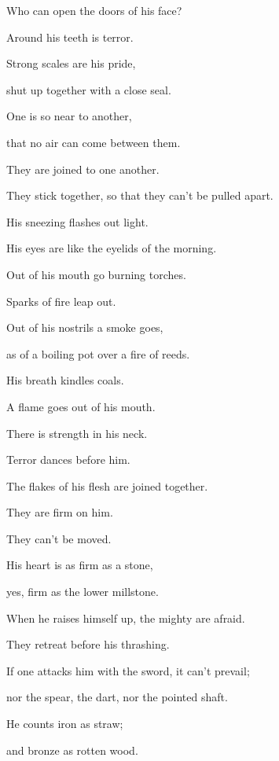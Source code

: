 {\par }{\Q {}Who can open the doors of his face?
\par }{\QB Around his teeth is terror.
\par }{\Q {}Strong scales are his pride,
\par }{\QB shut up together with a close seal.
\par }{\BB \par }{\Q {}One is so near to another,
\par }{\QB that no air can come between them.
\par }{\Q {}They are joined to one another.
\par }{\QB They stick together, so that they can’t be pulled apart.
\par }{\Q {}His sneezing flashes out light.
\par }{\QB His eyes are like the eyelids of the morning.
\par }{\Q {}Out of his mouth go burning torches.
\par }{\QB Sparks of fire leap out.
\par }{\Q {}Out of his nostrils a smoke goes,
\par }{\QB as of a boiling pot over a fire of reeds.
\par }{\Q {}His breath kindles coals.
\par }{\QB A flame goes out of his mouth.
\par }{\Q {}There is strength in his neck.
\par }{\QB Terror dances before him.
\par }{\Q {}The flakes of his flesh are joined together.
\par }{\QB They are firm on him.
\par }{\QB They can’t be moved.
\par }{\Q {}His heart is as firm as a stone,
\par }{\QB yes, firm as the lower millstone.
\par }{\Q {}When he raises himself up, the mighty are afraid.
\par }{\QB They retreat before his thrashing.
\par }{\Q {}If one attacks him with the sword, it can’t prevail;
\par }{\QB nor the spear, the dart, nor the pointed shaft.
\par }{\Q {}He counts iron as straw;
\par }{\QB and bronze as rotten wood.
}

